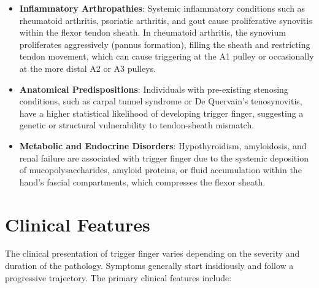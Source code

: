\begin{itemize}
  \item \textbf{Inflammatory Arthropathies}: Systemic inflammatory conditions such as rheumatoid arthritis, psoriatic arthritis, and gout cause proliferative synovitis within the flexor tendon sheath. In rheumatoid arthritis, the synovium proliferates aggressively (pannus formation), filling the sheath and restricting tendon movement, which can cause triggering at the A1 pulley or occasionally at the more distal A2 or A3 pulleys.
  \item \textbf{Anatomical Predispositions}: Individuals with pre-existing stenosing conditions, such as carpal tunnel syndrome or De Quervain's tenosynovitis, have a higher statistical likelihood of developing trigger finger, suggesting a genetic or structural vulnerability to tendon-sheath mismatch.
  \item \textbf{Metabolic and Endocrine Disorders}: Hypothyroidism, amyloidosis, and renal failure are associated with trigger finger due to the systemic deposition of mucopolysaccharides, amyloid proteins, or fluid accumulation within the hand's fascial compartments, which compresses the flexor sheath.
\end{itemize}

\section*{Clinical Features}
The clinical presentation of trigger finger varies depending on the severity and duration of the pathology. Symptoms generally start insidiously and follow a progressive trajectory. The primary clinical features include:

